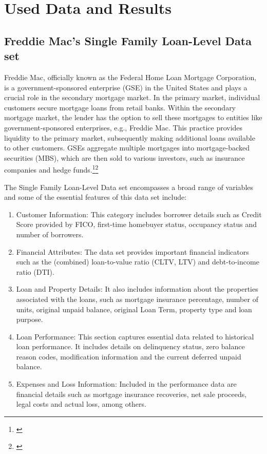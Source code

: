 \chapter{Used Data and Results}
\label{ch:RE}
\section{Freddie Mac's Single Family Loan-Level Data set}

Freddie Mac, officially known as the Federal Home Loan Mortgage Corporation, is a government-sponsored enterprise (GSE) in the United States and plays a crucial role in the secondary mortgage market. In the primary market, individual customers secure mortgage loans from retail banks. Within the secondary mortgage market, the lender has the option to sell these mortgages to entities like government-sponsored enterprises, e.g., Freddie Mac. This practice provides liquidity to the primary market, subsequently making additional loans available to other customers. GSEs aggregate multiple mortgages into mortgage-backed securities (MBS), which are then sold to various investors, such as insurance companies and hedge funds.\footnote{\cite{FreddieMac:2023}}\footnote{\cite{SecMortMark:2023}}

The Single Family Loan-Level Data set encompasses a broad range of variables and some of the essential features of this data set include:

\begin{enumerate}
\item Customer Information: This category includes borrower details such as Credit Score provided by FICO, first-time homebuyer status, occupancy status and number of borrowers.
\item Financial Attributes: The data set provides important financial indicators such as the (combined) loan-to-value ratio (CLTV, LTV) and debt-to-income ratio (DTI).
\item Loan and Property Details: It also includes information about the properties associated with the loans, such as mortgage insurance percentage, number of units, original unpaid balance, original Loan Term, property type and loan purpose.
\item Loan Performance: This section captures essential data related to historical loan performance. It includes details on delinquency status, zero balance reason codes, modification information and the current deferred unpaid balance.
\item Expenses and Loss Information: Included in the performance data are financial details such as mortgage insurance recoveries, net sale proceeds, legal costs and actual loss, among others.
\end{enumerate}

